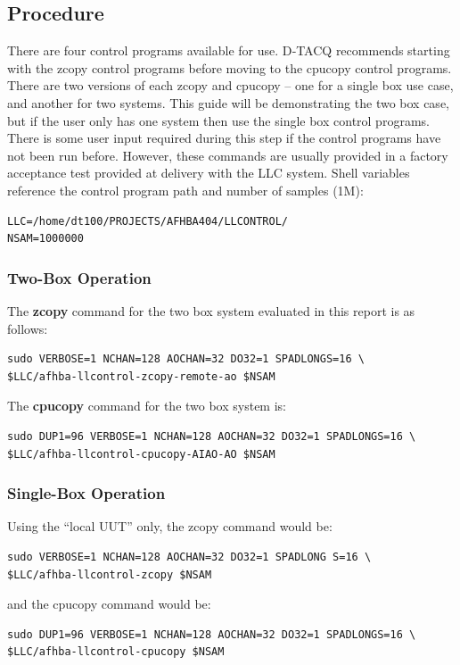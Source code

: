\documentclass{article}
\begin{document}
\subsection{Procedure}
There are four control programs available for use.
D‑TACQ  recommends starting with the zcopy control programs before moving to the cpucopy control programs.
There are two versions of each zcopy and cpucopy – one for a single box use case, and another for two systems.
This guide will be demonstrating the two box case, but if the user only has one system then use the single box control programs.
There is some user input required during this step if the control programs have not been run before.
However, these commands are usually provided in a factory acceptance test provided at delivery with the LLC system.
Shell variables reference the control program path and number of samples (1M):
\begin{verbatim}
LLC=/home/dt100/PROJECTS/AFHBA404/LLCONTROL/
NSAM=1000000
\end{verbatim}

\subsubsection{Two-Box Operation}
The \textbf{zcopy} command for the two box system evaluated in this report is as follows:

\begin{verbatim}
sudo VERBOSE=1 NCHAN=128 AOCHAN=32 DO32=1 SPADLONGS=16 \
$LLC/afhba-llcontrol-zcopy-remote-ao $NSAM
\end{verbatim}

The \textbf{cpucopy} command for the two box system is:
\begin{verbatim}
sudo DUP1=96 VERBOSE=1 NCHAN=128 AOCHAN=32 DO32=1 SPADLONGS=16 \
$LLC/afhba-llcontrol-cpucopy-AIAO-AO $NSAM
\end{verbatim}

\subsubsection{Single-Box Operation}

Using the “local UUT” only, the zcopy command would be:
\begin{verbatim}
sudo VERBOSE=1 NCHAN=128 AOCHAN=32 DO32=1 SPADLONG S=16 \
$LLC/afhba-llcontrol-zcopy $NSAM
\end{verbatim}

and the cpucopy command would be:

\begin{verbatim}
sudo DUP1=96 VERBOSE=1 NCHAN=128 AOCHAN=32 DO32=1 SPADLONGS=16 \
$LLC/afhba-llcontrol-cpucopy $NSAM
\end{verbatim}
\end{document}
